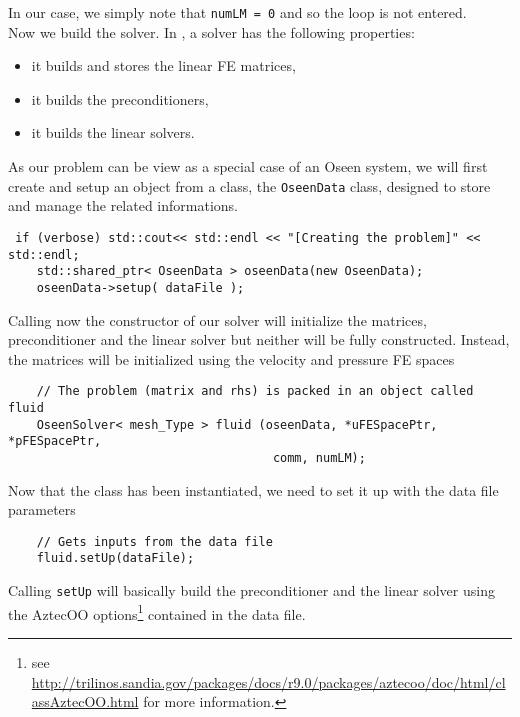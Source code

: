 \noindent In our case, we simply note that \verb|numLM = 0| and so the loop is not entered.\\

Now we build the solver. In \lifev,
a solver has the following properties:
\begin{itemize}
\item it builds and stores the linear FE matrices,
\item it builds the preconditioners,
\item it builds the linear solvers.
\end{itemize}
As our problem can be view as a special case of an Oseen system, we will first create and setup an object from a class, the \verb+OseenData+ class, designed to store and manage the related informations.

\begin{verbatim}
 if (verbose) std::cout<< std::endl << "[Creating the problem]" << std::endl;
    std::shared_ptr< OseenData > oseenData(new OseenData);
    oseenData->setup( dataFile );
\end{verbatim}    


Calling now the constructor of our solver will initialize the matrices, preconditioner and the linear solver
but neither will be fully constructed. Instead, the matrices will be initialized using the
velocity and pressure FE spaces


\begin{verbatim}
    // The problem (matrix and rhs) is packed in an object called fluid
    OseenSolver< mesh_Type > fluid (oseenData, *uFESpacePtr, *pFESpacePtr,
                                     comm, numLM);                       
\end{verbatim}

Now that the class has been instantiated, we need to set it up with the data file parameters

\begin{verbatim}
    // Gets inputs from the data file
    fluid.setUp(dataFile);
\end{verbatim}
    
\noindent Calling \verb|setUp|
will basically build the preconditioner and the linear solver using the AztecOO 
options\footnote{see \url{http://trilinos.sandia.gov/packages/docs/r9.0/packages/aztecoo/doc/html/classAztecOO.html} for more information.}
contained in the data file.   


